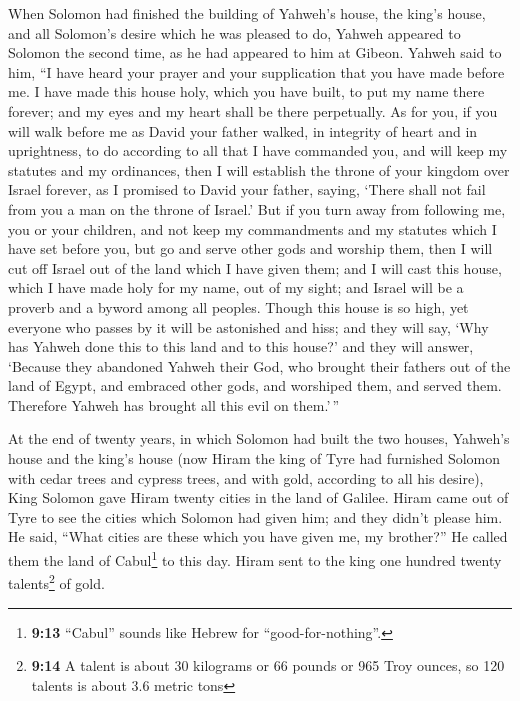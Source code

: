  When Solomon had finished the building of Yahweh's house,
the king's house, and all Solomon's desire which he was pleased to do,
 Yahweh appeared to Solomon the second time, as he had
appeared to him at Gibeon.  Yahweh said to him, ``I have
heard your prayer and your supplication that you have made before me. I
have made this house holy, which you have built, to put my name there
forever; and my eyes and my heart shall be there perpetually.
 As for you, if you will walk before me as David your
father walked, in integrity of heart and in uprightness, to do according
to all that I have commanded you, and will keep my statutes and my
ordinances,  then I will establish the throne of your
kingdom over Israel forever, as I promised to David your father, saying,
`There shall not fail from you a man on the throne of Israel.'
 But if you turn away from following me, you or your
children, and not keep my commandments and my statutes which I have set
before you, but go and serve other gods and worship them, 
then I will cut off Israel out of the land which I have given them; and
I will cast this house, which I have made holy for my name, out of my
sight; and Israel will be a proverb and a byword among all peoples.
 Though this house is so high, yet everyone who passes by
it will be astonished and hiss; and they will say, `Why has Yahweh done
this to this land and to this house?'  and they will
answer, `Because they abandoned Yahweh their God, who brought their
fathers out of the land of Egypt, and embraced other gods, and worshiped
them, and served them. Therefore Yahweh has brought all this evil on
them.'\,''

 At the end of twenty years, in which Solomon had built
the two houses, Yahweh's house and the king's house  (now
Hiram the king of Tyre had furnished Solomon with cedar trees and
cypress trees, and with gold, according to all his desire), King Solomon
gave Hiram twenty cities in the land of Galilee.  Hiram
came out of Tyre to see the cities which Solomon had given him; and they
didn't please him.  He said, ``What cities are these
which you have given me, my brother?'' He called them the land of
Cabul\footnote{\textbf{9:13} ``Cabul'' sounds like Hebrew for
  ``good-for-nothing''.} to this day.  Hiram sent to the
king one hundred twenty talents\footnote{\textbf{9:14} A talent is about
  30 kilograms or 66 pounds or 965 Troy ounces, so 120 talents is about
  3.6 metric tons} of gold.

